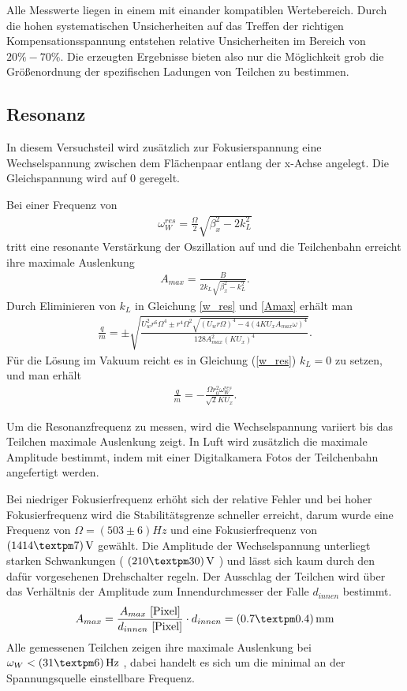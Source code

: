 \documentclass[a4paper,12pt]{article}
\begin{document}
Alle Messwerte liegen in einem mit einander kompatiblen Wertebereich. Durch die hohen systematischen Unsicherheiten auf das 
Treffen der richtigen Kompensationsspannung entstehen relative Unsicherheiten im Bereich von $20\% - 70 \%$. Die erzeugten
Ergebnisse bieten also nur die Möglichkeit grob die Größenordnung der spezifischen Ladungen von Teilchen zu bestimmen.  

\subsection{Resonanz}
In diesem Versuchsteil wird zusätzlich zur Fokusierspannung eine Wechselspannung zwischen dem Flächenpaar entlang der x-Achse angelegt.
Die Gleichspannung wird auf $0$ geregelt.

Bei einer Frequenz von
\begin{align}\label{w_res}
	\omega^{res}_W = \frac{\Omega}{2}\sqrt{\beta^{2}_x-2k^{2}_L}
\end{align}
tritt eine resonante Verstärkung der Oszillation auf und die Teilchenbahn erreicht ihre maximale Auslenkung
\begin{align}\label{Amax}
	A_{max} = \frac{B}{2k_L\sqrt{\beta^{2}_x-k^{2}_L}}.
\end{align}
Durch Eliminieren von $k_L$ in Gleichung \ref{w_res} und \ref{Amax} erhält man
\begin{align}\label{res_luft}
	\frac{q}{m} = ±\sqrt{
		\frac{
			U_w^2r^6Ω^4 ± r^4Ω^2\sqrt{
				(U_wrΩ)^4 - 4(4KU_xA_{max}ω)^4
			} %
		}{
			128A_{max}^2(KU_x)^4
		} %
	}. %
\end{align}
Für die Lösung im Vakuum reicht es in Gleichung (\ref{w_res}) $k_L=0$ zu setzen, und man erhält
\begin{align}\label{res_vak}
	\frac{q}{m} = -\frac{\Omega r^{2}_0 \omega^{res}_W}{\sqrt{2} K U_x}.
\end{align}

Um die Resonanzfrequenz zu messen, wird die Wechselspannung variiert bis das Teilchen maximale Auslenkung zeigt.
In Luft wird zusätzlich die maximale Amplitude bestimmt, indem mit einer Digitalkamera Fotos der Teilchenbahn angefertigt werden.

Bei niedriger Fokusierfrequenz erhöht sich der relative Fehler und bei hoher Fokusierfrequenz wird die Stabilitätsgrenze schneller erreicht,
darum wurde eine Frequenz von $Ω = (503±6)\unit{Hz}$ und eine Fokusierfrequenz von $\unit[(1414±7)]{V}$ gewählt.
Die Amplitude der Wechselspannung unterliegt starken Schwankungen
( $ \unit[( 210 ± 30 )]{V} $ )
und lässt sich kaum durch den dafür vorgesehenen Drehschalter regeln.
Der Ausschlag der Teilchen wird über das Verhältnis der Amplitude zum Innendurchmesser der Falle $d_{innen}$ bestimmt.
$$A_{max} = \frac{A_{max}\text{ [Pixel]}}{d_{innen}\text{ [Pixel]}} \cdot d_{innen}= \unit[( 0.7 ± 0.4 )]{mm} $$
Alle gemessenen Teilchen zeigen ihre maximale Auslenkung bei $\omega_W < \unit[(31±6)]{Hz}$ ,
dabei handelt es sich um die minimal an der Spannungsquelle einstellbare Frequenz.
\end{document}
